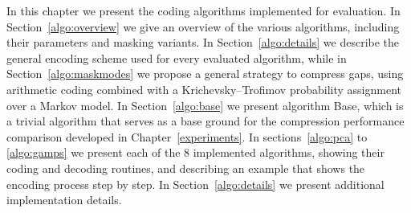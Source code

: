 





In this chapter we present the coding algorithms implemented for evaluation. In Section~\ref{algo:overview} we give an overview of the various algorithms, including their parameters and masking variants. In Section~\ref{algo:details} we describe the general encoding scheme used for every evaluated algorithm, while in Section~\ref{algo:maskmodes} we propose a general strategy to compress gaps, using arithmetic coding combined with a Krichevsky–Trofimov probability assignment over a Markov model. In Section~\ref{algo:base} we present algorithm Base, which is a trivial algorithm that serves as a base ground for the compression performance comparison developed in Chapter~\ref{experiments}. In sections~\ref{algo:pca} to \ref{algo:gamps} we present each of the 8 implemented algorithms, showing their coding and decoding routines, and describing an example that shows the encoding process step by step. In Section~\ref{algo:details} we present additional implementation details. 

